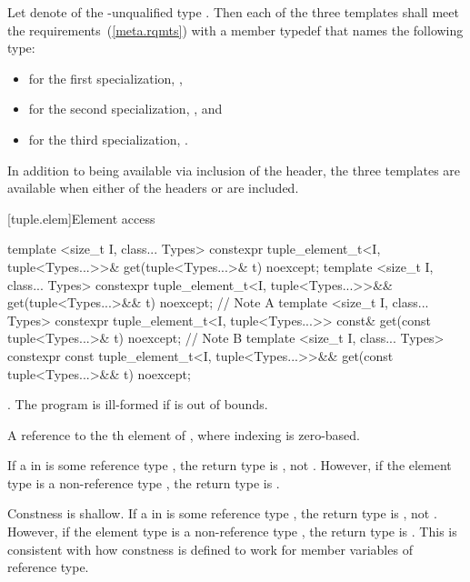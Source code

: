 \begin{itemdescr}
\pnum
Let  denote  of the \cv-unqualified type . Then
each of the three templates shall meet the 
requirements~(\ref{meta.rqmts}) with a member typedef  that names the following
type:

\begin{itemize}
\item
for the first specialization, ,
\item
for the second specialization, , and
\item
for the third specialization, .
\end{itemize}

\pnum
In addition to being available via inclusion of the  header,
the three templates are available when either of the headers  or
 are included.
\end{itemdescr}

[tuple.elem]{Element access}

%
\begin{itemdecl}
template <size_t I, class... Types>
  constexpr tuple_element_t<I, tuple<Types...>>& get(tuple<Types...>& t) noexcept;
template <size_t I, class... Types>
  constexpr tuple_element_t<I, tuple<Types...>>&& get(tuple<Types...>&& t) noexcept; // Note A
template <size_t I, class... Types>
  constexpr tuple_element_t<I, tuple<Types...>> const& get(const tuple<Types...>& t) noexcept; // Note B
template <size_t I, class... Types>
  constexpr const tuple_element_t<I, tuple<Types...>>&& get(const tuple<Types...>&& t) noexcept; 
\end{itemdecl}

\begin{itemdescr}
\pnum
\requires {}.
The program is ill-formed if  is out of bounds.

\pnum
\returns  A reference to the th element of , where
indexing is zero-based.

\pnum
\begin{note}[Note A]
If a  in  is some reference type ,
the return type is , not .
However, if the element type is a non-reference type ,
the return type is .
\end{note}

\pnum
\begin{note}[Note B]
Constness is shallow. If a 
in  is some
reference type , the return type is , not .
However, if the element type is a non-reference type ,
the return type is .
This is consistent with how constness is defined to work
for member variables of reference type.
\end{note}
\end{itemdescr}

